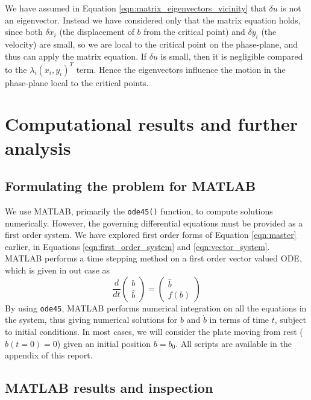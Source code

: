 \documentclass{report}
\begin{document}
We have assumed in Equation \ref{eqn:matrix_eigenvectors_vicinity} that $\delta u$ is not an eigenvector.
Instead we have considered only that the matrix equation holds,
since both $\delta x_i$ (the displacement of $b$ from the critical point)
and $\delta y_i$ (the velocity) are small, so we are local to the critical point on the phase-plane,
and thus can apply the matrix equation. If $\delta u$ is small, then it is negligible compared to the $\lambda_i (x_i,y_i)^T$ term.
Hence the eigenvectors influence the motion in the phase-plane local to the critical points. 

\section{Computational results and further analysis}

\subsection{Formulating the problem for MATLAB}

We use MATLAB, primarily the \texttt{ode45()} function, to compute solutions numerically.
However, the governing differential equations must be provided as a first order system.
We have explored first order forms of Equation \ref{eqn:master} earlier,
in Equations \ref{eqn:first_order_system} and \ref{eqn:vector_system}.
MATLAB performs a time stepping method on a first order vector valued ODE,
which is given in out case as
\begin{equation*}
	\frac{d}{dt}\begin{pmatrix}
		b \\
		\hat{b}
	\end{pmatrix} = \begin{pmatrix}
		\hat{b} \\
		f(b)	
	\end{pmatrix}
\end{equation*}
By using \texttt{ode45}, MATLAB performs numerical integration on all the equations in the system,
thus giving numerical solutions for $b$ and $\dot{b}$ in terms of time $t$, subject to initial conditions.
In most cases, we will consider the plate moving from rest ($\hat{b}(t=0) = 0$) given an initial position $b=b_0$.
All scripts are available in the appendix of this report.

\subsection{MATLAB results and inspection}
\end{document}

